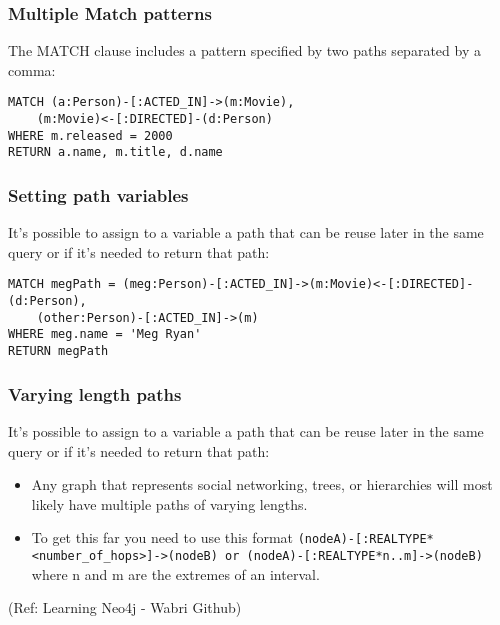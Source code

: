 \begin{frame}[fragile]\frametitle{Multiple Match patterns}

The MATCH clause includes a pattern specified by two paths separated by a comma:

\begin{lstlisting}
MATCH (a:Person)-[:ACTED_IN]->(m:Movie),
    (m:Movie)<-[:DIRECTED]-(d:Person)
WHERE m.released = 2000
RETURN a.name, m.title, d.name
\end{lstlisting}

\end{frame}

\begin{frame}[fragile]\frametitle{Setting path variables}

It's possible to assign to a variable a path that can be reuse later in the same query or if it's needed to return that path:


\begin{lstlisting}
MATCH megPath = (meg:Person)-[:ACTED_IN]->(m:Movie)<-[:DIRECTED]-(d:Person),
    (other:Person)-[:ACTED_IN]->(m)
WHERE meg.name = 'Meg Ryan'
RETURN megPath
\end{lstlisting}

\end{frame}

\begin{frame}[fragile]\frametitle{Varying length paths}

It's possible to assign to a variable a path that can be reuse later in the same query or if it's needed to return that path:


\begin{itemize}
\item Any graph that represents social networking, trees, or hierarchies will most likely have multiple paths of varying lengths.

\item To get this far you need to use this format \lstinline|(nodeA)-[:REALTYPE*<number_of_hops>]->(nodeB) or (nodeA)-[:REALTYPE*n..m]->(nodeB)| where n and m are the extremes of an interval.
\end{itemize}

{\tiny (Ref: Learning Neo4j - Wabri Github)}
\end{frame}

